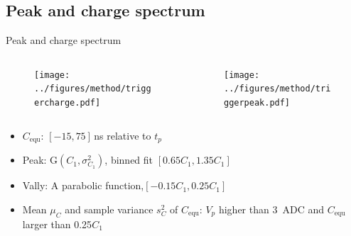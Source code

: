 \documentclass[aspectratio=169]{beamer}
\begin{document}
\subsection{Peak and charge spectrum}
\begin{frame}{Peak and charge spectrum}
    \begin{columns}
        \begin{column}{0.4\textwidth}
            \begin{figure}
                \texttt{[image: ../figures/method/triggercharge.pdf]}    
            \end{figure}
        \end{column}
        \begin{column}{0.4\textwidth}
            \begin{figure}
                \texttt{[image: ../figures/method/triggerpeak.pdf]}
            \end{figure}
        \end{column}
    \end{columns}
    \begin{itemize}
        \item $C_{\mathrm{equ}}$: $[-15, 75]$\,ns relative to $t_p$
        \item Peak: G$(C_1,\sigma^2_{C_1})$, binned fit $[0.65C_1, 1.35C_1]$
        \item Vally: A parabolic function,$[-0.15C_1, 0.25C_1]$
        \item Mean $\mu_{C}$ and sample variance $s^2_{C}$ of $C_{\mathrm{equ}}$: $V_p$ higher than \SI{3}{ADC} and $C_{\mathrm{equ}}$ larger than 0.25$C_1$
    \end{itemize}
\end{frame}
\end{document}

